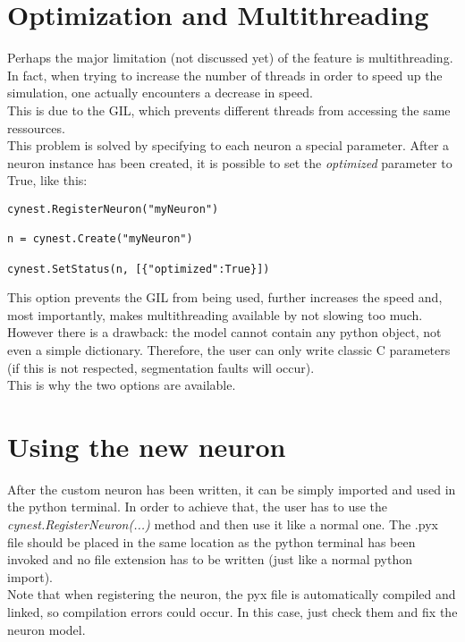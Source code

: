 \documentclass{article}
\begin{document}
\section{Optimization and Multithreading}
Perhaps the major limitation (not discussed yet) of the feature is multithreading. In fact, when trying to increase the number of threads in order to speed up the simulation, one actually encounters a decrease in speed.\\
This is due to the GIL, which prevents different threads from accessing the same ressources.\\
This problem is solved by specifying to each neuron a special parameter. After a neuron instance has been created, it is possible to set the \emph{optimized} parameter to True, like this:
\begin{verbatim}
cynest.RegisterNeuron("myNeuron")

n = cynest.Create("myNeuron")

cynest.SetStatus(n, [{"optimized":True}])
\end{verbatim}
This option prevents the GIL from being used, further increases the speed and, most importantly, makes multithreading available by not slowing too much.\\
However there is a drawback: the model cannot contain any python object, not even a simple dictionary. Therefore, the user can only write classic C parameters (if this is not respected, segmentation faults will occur).\\
This is why the two options are available.


\section{Using the new neuron}
After the custom neuron has been written, it can be simply imported and used in the python terminal. In order to achieve that, the user has to use the \emph{cynest.RegisterNeuron(...)} method and then use it like a normal one. The .pyx file should be placed in the same location as the python terminal has been invoked and no file extension has to be written (just like a normal python import).\\
Note that when registering the neuron, the pyx file is automatically compiled and linked, so compilation errors could occur. In this case, just check them and fix the neuron model.
\end{document}
